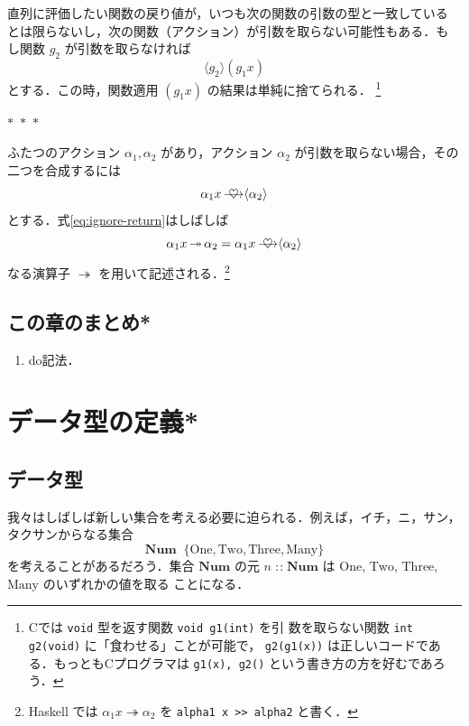 \documentclass[a5paper,twoside,fleqn,draft]{jsbook}
\newcommand{\separator}{\begin{center}$*$~$*$~$*$\end{center}}
\newcommand{\programminglanguage}[1]{\textsf{#1}}
\newcommand{\clang}{\programminglanguage{C}}
\newcommand{\haskell}{\programminglanguage{Haskell}}
\newcommand{\code}[1]{\texttt{#1}}
\newcommand{\mSpecialConstant}[1]{\textrm{#1}}
\newcommand{\mNumOne}{\mSpecialConstant{One}}
\newcommand{\mNumTwo}{\mSpecialConstant{Two}}
\newcommand{\mNumThree}{\mSpecialConstant{Three}}
\newcommand{\mNumMany}{\mSpecialConstant{Many}}
\DeclareMathOperator{\mBind}{\heartsuit}
\DeclareMathOperator{\mBindRight}{\ooalign{$\longrightarrow$\crcr\hss$\mBind$\hss}}
\DeclareMathOperator{\mBindRightIgnore}{\twoheadrightarrow}
\DeclareMathOperator{\mDefEq}{\stackrel{\mathrm{def}}{=}}
\DeclareMathOperator{\mIn}{{:\!:}}
\newcommand{\mSet}[1]{\mathbf{#1}}
\newcommand{\mFuncWith}[1]{\langle#1\rangle}  %
\begin{document}
直列に評価したい関数の戻り値が，いつも次の関数の引数の型と一致している
とは限らないし，次の関数（アクション）が引数を取らない可能性もある．も
し関数 $g_2$ が引数を取らなければ
\begin{equation}
\mFuncWith{g_2}(g_1x)
\end{equation}
とする．この時，関数適用 $(g_1x)$ の結果は単純に捨てられる．
\footnote{\clang では \code{void} 型を返す関数 \code{void g1(int)} を引
  数を取らない関数 \code{int g2(void)} に「食わせる」ことが可能で，
  \code{g2(g1(x))} は正しいコードである．もっとも\clang プログラマは
  \code{g1(x), g2()} という書き方の方を好むであろう．}

\separator

ふたつのアクション $\alpha_1,\alpha_2$ があり，アクション $\alpha_2$
が引数を取らない場合，その二つを合成するには
\begin{equation}
\label{eq:ignore-return}
\alpha_1 x\mBindRight\mFuncWith{\alpha_2}
\end{equation}
とする．式\eqref{eq:ignore-return}はしばしば
\begin{equation}
\alpha_1 x\mBindRightIgnore\alpha_2=\alpha_1x\mBindRight\mFuncWith{\alpha_2}
\end{equation}
なる演算子 $\mBindRightIgnore$ を用いて記述される．\footnote{\haskell
  では $\alpha_1x\mBindRightIgnore\alpha_2$ を \code{alpha1 x >>
    alpha2} と書く．}

\section{この章のまとめ*}

\begin{enumerate}
\item do記法．
\end{enumerate}

\chapter{データ型の定義*}
\label{ch:data-type}

\section{データ型}

我々はしばしば新しい集合を考える必要に迫られる．例えば，イチ，ニ，サン，
タクサンからなる集合
\begin{equation}
\mSet{Num}\mDefEq\{\mNumOne,\mNumTwo,\mNumThree,\mNumMany\}
\end{equation}
を考えることがあるだろう．集合 $\mSet{Num}$ の元 $n\mIn\mSet{Num}$ は
$\mNumOne$, $\mNumTwo$, $\mNumThree$, $\mNumMany$ のいずれかの値を取る
ことになる．
\end{document}
